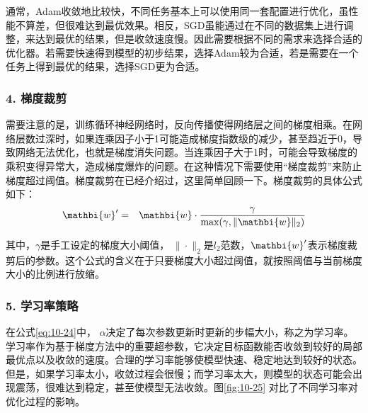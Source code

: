\parinterval 通常，Adam收敛地比较快，不同任务基本上可以使用同一套配置进行优化，虽性能不算差，但很难达到最优效果。相反，SGD虽能通过在不同的数据集上进行调整，来达到最优的结果，但是收敛速度慢。因此需要根据不同的需求来选择合适的优化器。若需要快速得到模型的初步结果，选择Adam较为合适，若是需要在一个任务上得到最优的结果，选择SGD更为合适。


\subsubsection{4. 梯度裁剪}

\parinterval 需要注意的是，训练循环神经网络时，反向传播使得网络层之间的梯度相乘。在网络层数过深时，如果连乘因子小于1可能造成梯度指数级的减少，甚至趋近于0，导致网络无法优化，也就是梯度消失问题。当连乘因子大于1时，可能会导致梯度的乘积变得异常大，造成梯度爆炸的问题。在这种情况下需要使用“梯度裁剪”来防止梯度超过阈值。梯度裁剪在{\chapternine}已经介绍过，这里简单回顾一下。梯度裁剪的具体公式如下：
\vspace{-0.5em}
\begin{eqnarray}
\mathbi{w}' &=& \mathbi{w} \cdot \frac{\gamma} {\textrm{max}(\gamma,\| \mathbi{w} \|_2)}
\label{eq:10-28}
\end{eqnarray}

\noindent 其中，$\gamma$是手工设定的梯度大小阈值， $\| \cdot \|_2$是$l_2$范数，$\mathbi{w}'$表示梯度裁剪后的参数。这个公式的含义在于只要梯度大小超过阈值，就按照阈值与当前梯度大小的比例进行放缩。


\subsubsection{5. 学习率策略}
\vspace{0.5em}

\parinterval 在公式\eqref{eq:10-24}中， $\alpha$决定了每次参数更新时更新的步幅大小，称之为学习率。学习率作为基于梯度方法中的重要超参数，它决定目标函数能否收敛到较好的局部最优点以及收敛的速度。合理的学习率能够使模型快速、稳定地达到较好的状态。但是，如果学习率太小，收敛过程会很慢；而学习率太大，则模型的状态可能会出现震荡，很难达到稳定，甚至使模型无法收敛。图\ref{fig:10-25} 对比了不同学习率对优化过程的影响。

